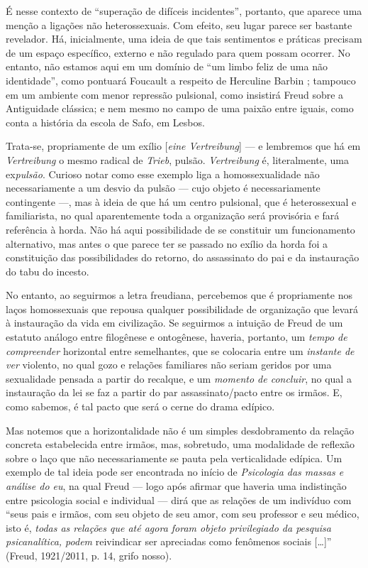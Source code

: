 É nesse contexto de ``superação de difíceis incidentes'', portanto, que
aparece uma menção a ligações não heterossexuais. Com efeito, seu lugar
parece ser bastante revelador. Há, inicialmente, uma ideia de que tais
sentimentos e práticas precisam de um espaço específico, externo e não
regulado para quem possam ocorrer. No entanto, não estamos aqui em um
domínio de ``um limbo feliz de uma não identidade'', como pontuará
Foucault a respeito de Herculine Barbin ; tampouco em um ambiente com
menor repressão pulsional, como insistirá Freud sobre a Antiguidade
clássica; e nem mesmo no campo de uma paixão entre iguais, como conta a
história da escola de Safo, em Lesbos.

Trata-se, propriamente de um exílio {[}\emph{eine Vertreibung}{]} --- e
lembremos que há em \emph{Vertreibung} o mesmo radical de \emph{Trieb},
pulsão. \emph{Vertreibung} é, literalmente, uma ex\emph{pulsão}.
Curioso notar como esse exemplo liga a homossexualidade não
necessariamente a um desvio da pulsão --- cujo objeto é necessariamente
contingente ---, mas à ideia de que há um centro pulsional, que é
heterossexual e familiarista, no qual aparentemente toda a organização
será provisória e fará referência à horda. Não há aqui possibilidade de
se constituir um funcionamento alternativo, mas antes o que parece ter
se passado no exílio da horda foi a constituição das possibilidades do
retorno, do assassinato do pai e da instauração do tabu do incesto.

No entanto, ao seguirmos a letra freudiana, percebemos que é
propriamente nos laços homossexuais que repousa qualquer possibilidade
de organização que levará à instauração da vida em civilização. Se
seguirmos a intuição de Freud de um estatuto análogo entre filogênese e
ontogênese, haveria, portanto, um \emph{tempo de compreender} horizontal
entre semelhantes, que se colocaria entre um \emph{instante de ver}
violento, no qual gozo e relações familiares não seriam geridos por uma
sexualidade pensada a partir do recalque, e um \emph{momento de
concluir}, no qual a instauração da lei se faz a partir do par
assassinato/pacto entre os irmãos. E, como sabemos, é tal pacto que será
o cerne do drama edípico.

Mas notemos que a horizontalidade não é um simples desdobramento da
relação concreta estabelecida entre irmãos, mas, sobretudo, uma
modalidade de reflexão sobre o laço que não necessariamente se pauta
pela verticalidade edípica. Um exemplo de tal ideia pode ser encontrada
no início de \emph{Psicologia das massas e análise do eu}, na qual Freud
--- logo após afirmar que haveria uma indistinção entre psicologia
social e individual --- dirá que as relações de um indivíduo com ``seus
pais e irmãos, com seu objeto de seu amor, com seu professor e seu
médico, isto é, \emph{todas as relações que até agora foram objeto
privilegiado da pesquisa psicanalítica, podem} reivindicar ser
apreciadas como fenômenos sociais {[}\ldots{}{]}'' (Freud, 1921/2011, p. 14,
grifo nosso).

